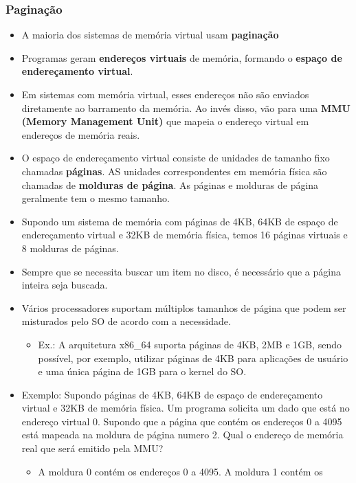 \documentclass[10pt]{article}
\begin{document}
\subsubsection{Paginação}
\begin{itemize}
    \item A maioria dos sistemas de memória virtual usam \textbf{paginação}
    \item Programas geram \textbf{endereços virtuais} de memória, formando o
        \textbf{espaço de endereçamento virtual}.
    \item Em sistemas com memória virtual, esses endereços não são enviados diretamente
        ao barramento da memória. Ao invés disso, vão para uma \textbf{MMU (Memory 
        Management Unit)}  que mapeia o endereço virtual em endereços de memória reais.
    \item O espaço de endereçamento virtual consiste de unidades de tamanho fixo chamadas
        \textbf{páginas}. AS unidades correspondentes em memória física são chamadas
        de \textbf{molduras de página}. As páginas e molduras de página geralmente
        tem o mesmo tamanho.
    \item Supondo um sistema de memória com páginas de 4KB, 64KB de espaço de 
        endereçamento virtual e 32KB de memória física, temos 16 páginas virtuais e
        8 molduras de páginas. 
    \item Sempre que se necessita buscar um item no disco, é necessário que a página
        inteira seja buscada.
    \item Vários processadores suportam múltiplos tamanhos de página que podem ser 
        misturados pelo SO de acordo com a necessidade.
        \begin{itemize}
            \item Ex.: A arquitetura x86\_64 suporta páginas de 4KB, 2MB e 1GB, sendo
                possível, por exemplo, utilizar páginas de 4KB para aplicações de
                usuário e uma única página de 1GB para o kernel do SO.
        \end{itemize}
    \item Exemplo: Supondo páginas de 4KB, 64KB de espaço de endereçamento virtual
        e 32KB de memória física. Um programa solicita um dado que está no endereço 
        virtual 0. Supondo que a página que contém os endereços 0 a 4095 está 
        mapeada na moldura de página numero 2. Qual o endereço de memória real que 
        será emitido pela MMU?
        \begin{itemize}
            \item A moldura 0 contém os endereços 0 a 4095. A moldura 1 contém os 

\end{itemize}
\end{itemize}
\end{document}
